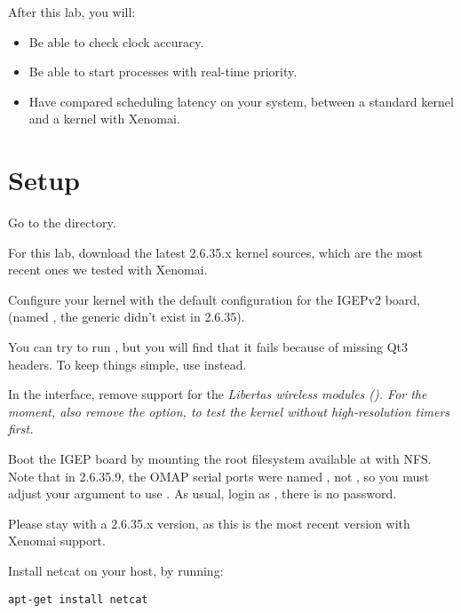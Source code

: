 
After this lab, you will:
\begin{itemize}
\item Be able to check clock accuracy.
\item Be able to start processes with real-time priority.
\item Have compared scheduling latency on your system, between a standard kernel and a kernel with Xenomai.
\end{itemize}

\section{Setup}

Go to the  directory.

For this lab, download the latest 2.6.35.x kernel sources, which 
are the most recent ones we tested with Xenomai.

Configure your kernel with the default configuration for the IGEPv2
board, (named , the generic 
didn't exist in 2.6.35).

You can try to run , but you will find that
it fails because of missing Qt3 headers. To keep things simple, use 
 instead. 

In the  interface, remove support for the 
\em{Libertas} wireless modules (). 
For the moment, also remove the 
option, to test the kernel without high-resolution timers first.

Boot the IGEP board by mounting the root filesystem available at
 with NFS. Note
that in 2.6.35.9, the OMAP serial ports were named , not
, so you must adjust your  argument to use
. As usual, login as , there is no password.

Please stay with a 2.6.35.x version, as this is the most recent
version with Xenomai support.

Install netcat on your host, by running:
\begin{verbatim}
apt-get install netcat
\end{verbatim}

